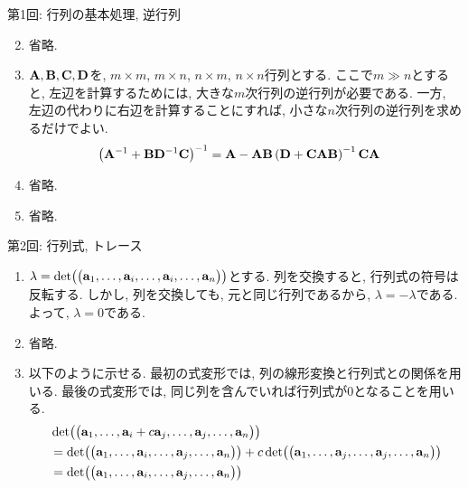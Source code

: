 \documentclass[dvipdfmx,notheorems,t]{beamer}
\begin{document}
\begin{frame}{第1回: 行列の基本処理, 逆行列}
\begin{enumerate}
  \setcounter{enumi}{1}
  \item 省略.
  \item $\vb{A}, \vb{B}, \vb{C}, \vb{D}$を, $m \times m$, $m \times n$, $n \times m$, $n \times n$行列とする.
  ここで$m \gg n$とすると, 左辺を計算するためには, 大きな$m$次行列の逆行列が必要である.
  一方, 左辺の代わりに右辺を計算することにすれば, 小さな$n$次行列の逆行列を求めるだけでよい.
  \begin{align*}
    \left( \vb{A}^{-1} + \vb{B} \vb{D}^{-1} \vb{C} \right)^{-1}
      &= \vb{A} - \vb{A} \vb{B}
        \left( \vb{D} + \vb{C} \vb{A} \vb{B} \right)^{-1} \vb{C} \vb{A}
  \end{align*}
  \item 省略.
  \item 省略.
\end{enumerate}
\end{frame}

\begin{frame}{第2回: 行列式, トレース}
\begin{enumerate}
  \item $\lambda = \det(\mqty(\vb{a}_1, \ldots, \vb{a}_i, \ldots, \vb{a}_i, \ldots, \vb{a}_n))$とする.
  列を交換すると, 行列式の符号は反転する.
  しかし, 列を交換しても, 元と同じ行列であるから, $\lambda = -\lambda$である.
  よって, $\lambda = 0$である.
  \item 省略.
  \item 以下のように示せる.
  最初の式変形では, 列の線形変換と行列式との関係を用いる.
  最後の式変形では, 同じ列を含んでいれば行列式が$0$となることを用いる.
  {\small \begin{align*}
    & \det(\mqty(\vb{a}_1, \ldots, \vb{a}_i + c \vb{a}_j, \ldots, \vb{a}_j, \ldots, \vb{a}_n)) \\
    &= \det(\mqty(\vb{a}_1, \ldots, \vb{a}_i, \ldots, \vb{a}_j, \ldots, \vb{a}_n))
      + c \det(\mqty(\vb{a}_1, \ldots, \vb{a}_j, \ldots, \vb{a}_j, \ldots, \vb{a}_n)) \\
    &= \det(\mqty(\vb{a}_1, \ldots, \vb{a}_i, \ldots, \vb{a}_j, \ldots, \vb{a}_n))
  \end{align*}}
\end{enumerate}
\end{frame}
\end{document}
